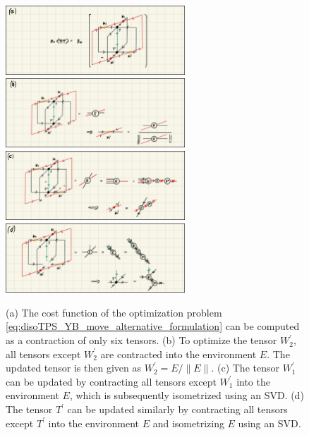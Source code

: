 \begin{figure}
	\centering
	\subcaptionbox{\label{fig:YB_move_iterate_polar_overlap}}
	{%
		\includegraphics[width=0.6\textwidth]{figures/disoTPS/YB_move_iterate_polar_a.jpeg}
	}
	\subcaptionbox{\label{fig:YB_move_iterate_polar_optimize_W2}}
	{%
		\includegraphics[width=0.6\textwidth]{figures/disoTPS/YB_move_iterate_polar_b.jpeg}
	}
	\subcaptionbox{\label{fig:YB_move_iterate_polar_optimize_W1}}
	{%
		\includegraphics[width=0.6\textwidth]{figures/disoTPS/YB_move_iterate_polar_c.jpeg}
	}
	\subcaptionbox{\label{fig:YB_move_iterate_polar_optimize_T}}
	{%
		\includegraphics[width=0.6\textwidth]{figures/disoTPS/YB_move_iterate_polar_d.jpeg}
	}
	\caption{(a) The cost function of the optimization problem \eqref{eq:disoTPS_YB_move_alternative_formulation} can be computed as a contraction of only six tensors. (b) To optimize the tensor $W_2^\prime$, all tensors except $W_2^\prime$ are contracted into the environment $E$. The updated tensor is then given as $W_2^\prime = E/\lVert E\rVert$. (c) The tensor $W_1^\prime$ can be updated by contracting all tensors except $W_1^\prime$ into the environment $E$, which is subsequently isometrized using an SVD. (d) The tensor $T^\prime$ can be updated similarly by contracting all tensors except $T^\prime$ into the environment $E$ and isometrizing $E$ using an SVD.}
	\label{fig:YB_move_iterate_polar}
\end{figure}